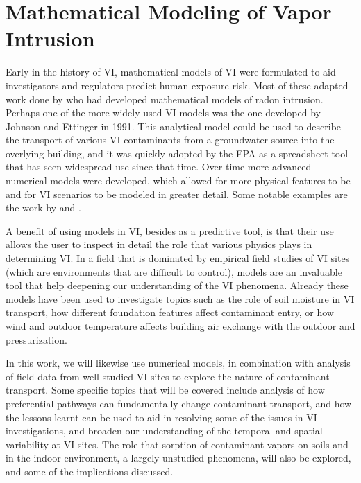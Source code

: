 \section{Mathematical Modeling of Vapor Intrusion}\label{sec:intro_modeling}

Early in the history of VI, mathematical models of VI were formulated to aid investigators and regulators predict human exposure risk.
Most of these adapted work done by \citeauthor{nazaroff_predicting_1988}\cite{nazaroff_predicting_1988} who had developed mathematical models of radon intrusion.
Perhaps one of the more widely used VI models was the one developed by Johnson and Ettinger in 1991\cite{johnson_heuristic_1991}.
This analytical model could be used to describe the transport of various VI contaminants from a groundwater source into the overlying building, and it was quickly adopted by the EPA as a spreadsheet tool that has seen widespread use since that time\cite{u.s._environmental_protection_agency_oswer_2015}.
Over time more advanced numerical models were developed, which allowed for more physical features to be and for VI scenarios to be modeled in greater detail.
Some notable examples are the work by \citeauthor{abreu_effect_2005}\cite{abreu_effect_2005} and \citeauthor{pennell_development_2009}\cite{pennell_development_2009}.\par

A benefit of using models in VI, besides as a predictive tool, is that their use allows the user to inspect in detail the role that various physics plays in determining VI.
In a field that is dominated by empirical field studies of VI sites (which are environments that are difficult to control), models are an invaluable tool that help deepening our understanding of the VI phenomena.
Already these models have been used to investigate topics such as the role of soil moisture in VI transport\cite{shen_influence_2013}, how different foundation features affect contaminant entry\cite{yao_simulating_2013}, or how wind and outdoor temperature affects building air exchange with the outdoor and pressurization\cite{shirazi_three-dimensional_2017}.\par

In this work, we will likewise use numerical models, in combination with analysis of field-data from well-studied VI sites to explore the nature of contaminant transport.
Some specific topics that will be covered include analysis of how preferential pathways can fundamentally change contaminant transport, and how the lessons learnt can be used to aid in resolving some of the issues in VI investigations, and broaden our understanding of the temporal and spatial variability at VI sites.
The role that sorption of contaminant vapors on soils and in the indoor environment, a largely unstudied phenomena, will also be explored, and some of the implications discussed.\par
